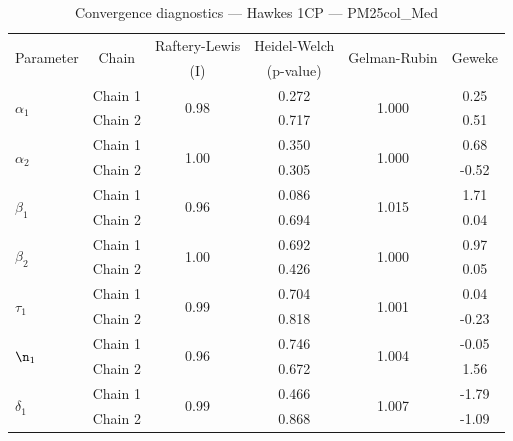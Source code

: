 \begin{table}[H]
\centering
\caption{Convergence diagnostics — Hawkes 1CP — PM25col_Med}
\begin{tabular}{lccccc}
\toprule
\multirow{2}{*}{Parameter} & \multirow{2}{*}{Chain} & Raftery-Lewis & Heidel-Welch & \multirow{2}{*}{Gelman-Rubin} & \multirow{2}{*}{Geweke} \\
 & & (I) & (p-value) & & (z) \\
\midrule
\multirow{2}{*}{$\alpha_1$} & Chain 1 & \multirow{2}{*}{0.98} & 0.272 & \multirow{2}{*}{1.000} & 0.25 \\
 & Chain 2 & & 0.717 & & 0.51 \\
\multirow{2}{*}{$\alpha_2$} & Chain 1 & \multirow{2}{*}{1.00} & 0.350 & \multirow{2}{*}{1.000} & 0.68 \\
 & Chain 2 & & 0.305 & & -0.52 \\
\midrule
\multirow{2}{*}{$\beta_1$} & Chain 1 & \multirow{2}{*}{0.96} & 0.086 & \multirow{2}{*}{1.015} & 1.71 \\
 & Chain 2 & & 0.694 & & 0.04 \\
\multirow{2}{*}{$\beta_2$} & Chain 1 & \multirow{2}{*}{1.00} & 0.692 & \multirow{2}{*}{1.000} & 0.97 \\
 & Chain 2 & & 0.426 & & 0.05 \\
\midrule
\multirow{2}{*}{$\tau_1$} & Chain 1 & \multirow{2}{*}{0.99} & 0.704 & \multirow{2}{*}{1.001} & 0.04 \\
 & Chain 2 & & 0.818 & & -0.23 \\
\midrule
\multirow{2}{*}{$\n_1$} & Chain 1 & \multirow{2}{*}{0.96} & 0.746 & \multirow{2}{*}{1.004} & -0.05 \\
 & Chain 2 & & 0.672 & & 1.56 \\
\midrule
\multirow{2}{*}{$\delta_1$} & Chain 1 & \multirow{2}{*}{0.99} & 0.466 & \multirow{2}{*}{1.007} & -1.79 \\
 & Chain 2 & & 0.868 & & -1.09 \\
\bottomrule
\end{tabular}
\end{table}
